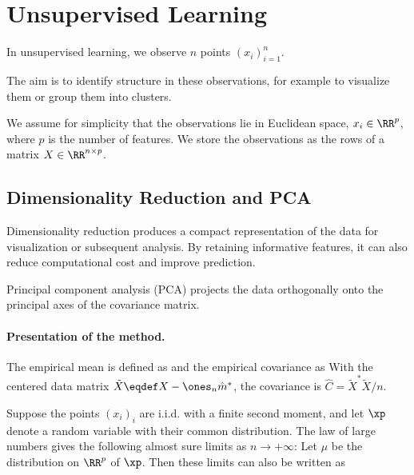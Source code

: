 \section{Unsupervised Learning}

In unsupervised learning, we observe $n$ points $(x_i)_{i=1}^n$.
 
The aim is to identify structure in these observations, for example to visualize them or group them into clusters.
 
We assume for simplicity that the observations lie in Euclidean space, $x_i \in \RR^p$, where $p$ is the number of features. We store the observations as the rows of a matrix $X\in\RR^{n\times p}$.


                                                  
\subsection{Dimensionality Reduction and PCA}

Dimensionality reduction produces a compact representation of the data for visualization or subsequent analysis. By retaining informative features, it can also reduce computational cost and improve prediction.
 
Principal component analysis (PCA) projects the data orthogonally onto the principal axes of the covariance matrix.

   
\paragraph{Presentation of the method.}

The empirical mean is defined as 
and the empirical covariance as
With the centered data matrix $\tilde X \eqdef X-\ones_n\hat m^*$, the covariance is $\hat C=\tilde X^*
\tilde X/n$. 

Suppose the points $(x_i)_i$ are i.i.d. with a finite second moment, and let $\xp$ denote a random variable with their common distribution. The law of large numbers gives the following almost sure limits as $n \rightarrow +\infty$:
Let $\mu$ be the distribution on $\RR^p$ of $\xp$. Then these limits can also be written as


